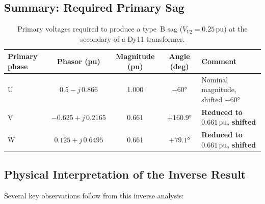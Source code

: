 \documentclass[a4paper,11pt]{article}
\begin{document}
\subsection{Summary: Required Primary Sag}

\begin{table}[h!]
\centering
\caption{Primary voltages required to produce a type~B sag
         ($V_{V2}{=}0.25\,\mathrm{pu}$) at the secondary of a Dy11
         transformer.}
\label{tab:inv_results}
\begin{tabular}{lcccl}
\toprule
\textbf{Primary phase} & \textbf{Phasor (pu)} & \textbf{Magnitude (pu)}
   & \textbf{Angle (deg)} & \textbf{Comment} \\
\midrule
U & $0.5 - j\,0.866$ & 1.000 & $-60°$  & Nominal magnitude, shifted $-60°$ \\
V & $-0.625 + j\,0.2165$ & 0.661 & $+160.9°$ & \textbf{Reduced to $0.661\,\mathrm{pu}$, shifted} \\
W & $0.125 + j\,0.6495$ & 0.661 & $+79.1°$  & \textbf{Reduced to $0.661\,\mathrm{pu}$, shifted} \\
\bottomrule
\end{tabular}
\end{table}

\subsection{Physical Interpretation of the Inverse Result}

Several key observations follow from this inverse analysis:
\end{document}
